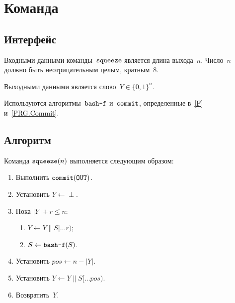 \section{Команда }\label{PRG.Squeeze}

\subsection{Интерфейс}\label{PRG.Squeeze.IFace}

Входными данными команды~$\texttt{squeeze}$ является длина выхода~$n$.
Число~$n$ должно быть неотрицательным целым, кратным~$8$.

Выходными данными является слово~$Y\in\{0,1\}^n$.

Используются алгоритмы~$\texttt{bash-f}$ и~$\texttt{commit}$, 
определенные в~\ref{F} и~\ref{PRG.Commit}.

\subsection{Алгоритм}\label{PRG.Squeeze.Alg}

Команда $\texttt{squeeze}(n)$ выполняется следующим образом:
\begin{enumerate}
\item
Выполнить
$\texttt{commit}(\texttt{OUT})$.
\item
Установить
$Y\leftarrow\perp$.
\item
Пока $|Y|+r\leq n$:
\begin{enumerate}
\item
$Y\leftarrow Y\parallel S[\dots r)$;
\item
$S\leftarrow\texttt{bash-f}(S)$.
\end{enumerate}
\item
Установить
$pos\leftarrow n-|Y|$.
\item
Установить
$Y\leftarrow Y\parallel S[\dots pos)$.
\item
Возвратить~$Y$.
\end{enumerate}

